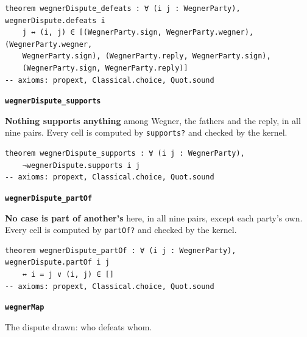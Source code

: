 \documentclass[11pt]{article}
\begin{document}
{\small\begin{verbatim}
theorem wegnerDispute_defeats : ∀ (i j : WegnerParty), wegnerDispute.defeats i
    j ↔ (i, j) ∈ [(WegnerParty.sign, WegnerParty.wegner), (WegnerParty.wegner,
    WegnerParty.sign), (WegnerParty.reply, WegnerParty.sign),
    (WegnerParty.sign, WegnerParty.reply)]
-- axioms: propext, Classical.choice, Quot.sound
\end{verbatim}}
\par\medskip\noindent\textbf{\texttt{wegner\allowbreak{}Dispute\_\allowbreak{}supports}}\par\nobreak\noindent
\textbf{Nothing supports anything} among Wegner, the fathers and the reply, in all nine pairs. Every cell is computed by \texttt{supports?} and checked by the kernel.

{\small\begin{verbatim}
theorem wegnerDispute_supports : ∀ (i j : WegnerParty),
    ¬wegnerDispute.supports i j
-- axioms: propext, Classical.choice, Quot.sound
\end{verbatim}}
\par\medskip\noindent\textbf{\texttt{wegner\allowbreak{}Dispute\_\allowbreak{}part\allowbreak{}Of}}\par\nobreak\noindent
\textbf{No case is part of another’s} here, in all nine pairs, except each party’s own. Every cell is computed by \texttt{part\allowbreak{}Of?} and checked by the kernel.

{\small\begin{verbatim}
theorem wegnerDispute_partOf : ∀ (i j : WegnerParty), wegnerDispute.partOf i j
    ↔ i = j ∨ (i, j) ∈ []
-- axioms: propext, Classical.choice, Quot.sound
\end{verbatim}}
\par\medskip\noindent\textbf{\texttt{wegner\allowbreak{}Map}}\par\nobreak\noindent
The dispute drawn: who defeats whom.
\end{document}

